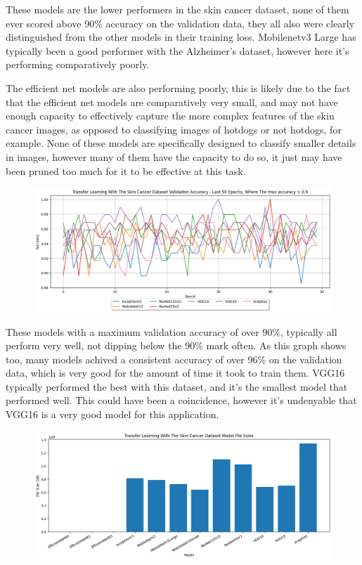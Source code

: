 \documentclass[]{final_report}
\begin{document}
These models are the lower performers in the skin cancer dataset, none of them ever scored above 90\% accuracy on the validation data, they all also were clearly distinguished from the other models in their training loss. Mobilenetv3 Large has typically been a good performer with the Alzheimer's dataset, however here it's performing comparatively poorly.

The efficient net models are also performing poorly, this is likely due to the fact that the efficient net models are comparatively very small, and may not have enough capacity to effectively capture the more complex features of the skin cancer images, as opposed to classifying images of hotdogs or not hotdogs, for example. None of these models are specifically designed to classify smaller details in images, however many of them have the capacity to do so, it just may have been pruned too much for it to be effective at this task.

\begin{figure}[ht!]
  \centering
  \includegraphics[width=1.1\textwidth]{images/Skin-cancer-validation-accuracy-last-50-high-performers.png}
\end{figure}

These models with a maximum validation accuracy of over 90\%, typically all perform very well, not dipping below the 90\% mark often. As this graph shows too, many models achived a consistent accuracy of over 96\% on the validation data, which is very good for the amount of time it took to train them. VGG16 typically performed the best with this dataset, and it's the smallest model that performed well. This could have been a coincidence, however it's undenyable that VGG16 is a very good model for this application.

\begin{figure}[ht!]
  \centering
  \includegraphics[width=1.1\textwidth]{images/skin-cancer-model-sizes-graph.png}
\end{figure}
\end{document}
